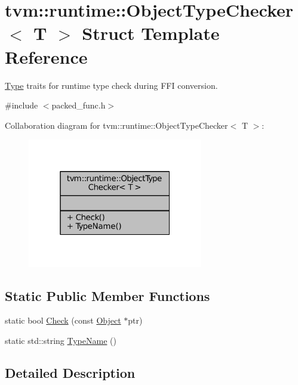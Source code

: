 \hypertarget{structtvm_1_1runtime_1_1ObjectTypeChecker}{}\section{tvm\+:\+:runtime\+:\+:Object\+Type\+Checker$<$ T $>$ Struct Template Reference}
\label{structtvm_1_1runtime_1_1ObjectTypeChecker}


\hyperlink{classtvm_1_1Type}{Type} traits for runtime type check during F\+FI conversion.  




{\ttfamily \#include $<$packed\+\_\+func.\+h$>$}



Collaboration diagram for tvm\+:\+:runtime\+:\+:Object\+Type\+Checker$<$ T $>$\+:
\nopagebreak
\begin{figure}[H]
\begin{center}
\leavevmode
\includegraphics[width=217pt]{structtvm_1_1runtime_1_1ObjectTypeChecker__coll__graph}
\end{center}
\end{figure}
\subsection*{Static Public Member Functions}
\begin{DoxyCompactItemize}
\item 
static bool \hyperlink{structtvm_1_1runtime_1_1ObjectTypeChecker_aba05348357ac739ea2d3deecc7a1b202}{Check} (const \hyperlink{classtvm_1_1runtime_1_1Object}{Object} $\ast$ptr)
\item 
static std\+::string \hyperlink{structtvm_1_1runtime_1_1ObjectTypeChecker_a3498eb545b33e1c23a417fa58ec51dd6}{Type\+Name} ()
\end{DoxyCompactItemize}


\subsection{Detailed Description}
